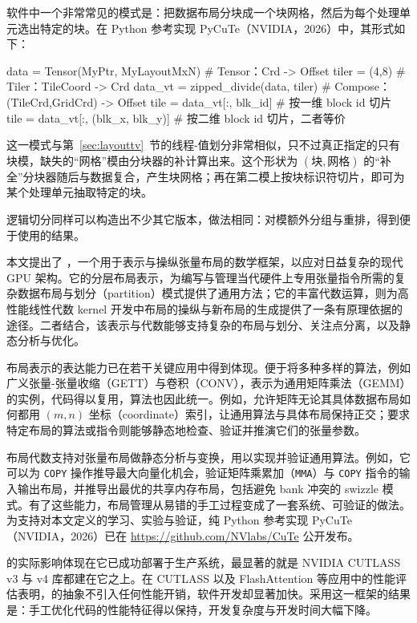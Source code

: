 软件中一个非常常见的模式是：把数据布局分块成一个块网格，然后为每个处理单元选出特定的块。在 Python 参考实现 PyCuTe（NVIDIA，2026）中，其形式如下：
\begin{python}
data    = Tensor(MyPtr, MyLayoutMxN)   # Tensor：Crd -> Offset
tiler   = (4,8)                        # Tiler：TileCoord -> Crd
data_vt = zipped_divide(data, tiler)   # Compose：(TileCrd,GridCrd) -> Offset
tile    = data_vt[:, blk_id]           # 按一维 block id 切片
tile    = data_vt[:, (blk_x, blk_y)]   # 按二维 block id 切片，二者等价
\end{python}
这一模式与第~\ref{sec:layouttv}~节的线程-值划分非常相似，只不过真正指定的只有块模，缺失的“网格”模由分块器的补计算出来。这个形状为 $(\text{块}, \text{网格})$ 的“补全”分块器随后与数据复合，产生块网格；再在第二模上按块标识符切片，即可为某个处理单元抽取特定的块。

逻辑切分同样可以构造出不少其它版本，做法相同：对模额外分组与重排，得到便于使用的结果。


本文提出了 \CuTe，一个用于表示与操纵张量布局的数学框架，以应对日益复杂的现代 GPU 架构。它的分层布局表示，为编写与管理当代硬件上专用张量指令所需的复杂数据布局与划分（partition）模式提供了通用方法；它的丰富代数运算，则为高性能线性代数 kernel 开发中布局的操纵与新布局的生成提供了一条有原理依据的途径。二者结合，该表示与代数能够支持复杂的布局与划分、关注点分离，以及静态分析与优化。

\CuTe 布局表示的表达能力已在若干关键应用中得到体现。\CuTe 便于将多种多样的算法，例如广义张量-张量收缩（GETT）与卷积（CONV），表示为通用矩阵乘法（GEMM）的实例，代码得以复用，算法也因此统一。例如，\CuTe 允许矩阵无论其具体数据布局如何都用 $(m,n)$ 坐标（coordinate）索引，让通用算法与具体布局保持正交；要求特定布局的算法或指令则能够静态地检查、验证并推演它们的张量参数。

\CuTe 布局代数支持对张量布局做静态分析与变换，用以实现并验证通用算法。例如，它可以为 \texttt{COPY} 操作推导最大向量化机会，验证矩阵乘累加（\texttt{MMA}）与 \texttt{COPY} 指令的输入输出布局，并推导出最优的共享内存布局，包括避免 bank 冲突的 swizzle 模式。有了这些能力，布局管理从易错的手工过程变成了一套系统、可验证的做法。为支持对本文定义的学习、实验与验证，纯 Python 参考实现 PyCuTe（NVIDIA，2026）已在 \url{https://github.com/NVlabs/CuTe} 公开发布。

\CuTe 的实际影响体现在它已成功部署于生产系统，最显著的就是 NVIDIA CUTLASS v3 与 v4 库都建在它之上。在 CUTLASS 以及 FlashAttention 等应用中的性能评估表明，\CuTe 的抽象不引入任何性能开销，软件开发却显著加快。采用这一框架的结果是：手工优化代码的性能特征得以保持，开发复杂度与开发时间大幅下降。

